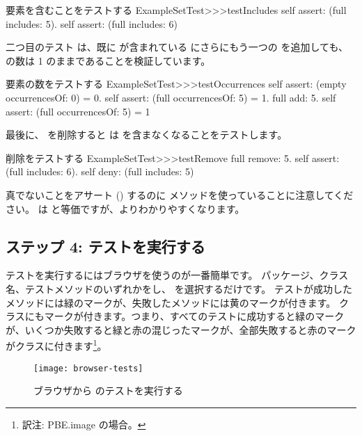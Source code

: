 \documentclass[a4paper,10pt,twoside]{book}
\begin{document}
\begin{method}[testIncludes]{要素を含むことをテストする}
ExampleSetTest>>>testIncludes
	self assert: (full includes: 5).
	self assert: (full includes: 6)
\end{method}

二つ目のテスト  は、既に  が含まれている  にさらにもう一つの  を追加しても、 の数は 1 のままであることを検証しています。

\begin{method}[testOccurrences]{要素の数をテストする}
ExampleSetTest>>>testOccurrences
	self assert: (empty occurrencesOf: 0) = 0.
	self assert: (full occurrencesOf: 5) = 1.
	full add: 5.
	self assert: (full occurrencesOf: 5) = 1
\end{method}

最後に、 を削除すると  は  を含まなくなることをテストします。

\begin{method}[testRemove]{削除をテストする}
ExampleSetTest>>>testRemove
	full remove: 5.
	self assert: (full includes: 6).
	self deny: (full includes: 5)
\end{method}

\noindent
真でないことをアサート () するのに  メソッドを使っていることに注意してください。
 は  と等価ですが、よりわかりやすくなります。
\subsection{ステップ 4: テストを実行する}

テストを実行するにはブラウザを使うのが一番簡単です。
パッケージ、クラス名、テストメソッドのいずれかを{\actclick}し、 を選択するだけです。
テストが成功したメソッドには緑のマークが、失敗したメソッドには黄のマークが付きます。
クラスにもマークが付きます。つまり、すべてのテストに成功すると緑のマークが、いくつか失敗すると緑と赤の混じったマークが、全部失敗すると赤のマークがクラスに付きます\footnote{訳注: PBE.image の場合。}。

\begin{figure}[tbh]
  \begin{center}
	\texttt{[image: browser-tests]}
	\caption{ブラウザから \sunit のテストを実行する}
  \end{center}
\end{figure}
\end{document}
